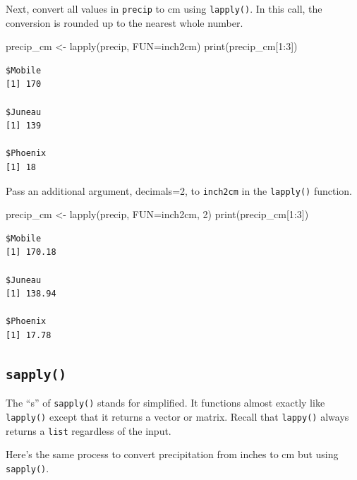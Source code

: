 \documentclass[
  letterpaper,
  DIV=11,
  numbers=noendperiod]{scrreprt}
\newenvironment{Shaded}{\begin{snugshade}}{\end{snugshade}}
\newcommand{\AttributeTok}[1]{\textcolor[rgb]{0.40,0.45,0.13}{#1}}
\newcommand{\DecValTok}[1]{\textcolor[rgb]{0.68,0.00,0.00}{#1}}
\newcommand{\FunctionTok}[1]{\textcolor[rgb]{0.28,0.35,0.67}{#1}}
\newcommand{\NormalTok}[1]{\textcolor[rgb]{0.00,0.23,0.31}{#1}}
\newcommand{\OtherTok}[1]{\textcolor[rgb]{0.00,0.23,0.31}{#1}}
\newcommand{\SpecialCharTok}[1]{\textcolor[rgb]{0.37,0.37,0.37}{#1}}
\begin{document}
Next, convert all values in \texttt{precip} to cm using
\texttt{lapply()}. In this call, the conversion is rounded up to the
nearest whole number.

\begin{Shaded}
\begin{Highlighting}[]
\NormalTok{precip\_cm }\OtherTok{\textless{}{-}} \FunctionTok{lapply}\NormalTok{(precip, }\AttributeTok{FUN=}\NormalTok{inch2cm)}
\FunctionTok{print}\NormalTok{(precip\_cm[}\DecValTok{1}\SpecialCharTok{:}\DecValTok{3}\NormalTok{])}
\end{Highlighting}
\end{Shaded}

\begin{verbatim}
$Mobile
[1] 170

$Juneau
[1] 139

$Phoenix
[1] 18
\end{verbatim}

Pass an additional argument, decimals=2, to \texttt{inch2cm} in the
\texttt{lapply()} function.

\begin{Shaded}
\begin{Highlighting}[]
\NormalTok{precip\_cm }\OtherTok{\textless{}{-}} \FunctionTok{lapply}\NormalTok{(precip, }\AttributeTok{FUN=}\NormalTok{inch2cm, }\DecValTok{2}\NormalTok{)}
\FunctionTok{print}\NormalTok{(precip\_cm[}\DecValTok{1}\SpecialCharTok{:}\DecValTok{3}\NormalTok{])}
\end{Highlighting}
\end{Shaded}

\begin{verbatim}
$Mobile
[1] 170.18

$Juneau
[1] 138.94

$Phoenix
[1] 17.78
\end{verbatim}

\subsection{\texorpdfstring{\texttt{sapply()}}{sapply()}}\label{sapply}

The ``s'' of \texttt{sapply()} stands for simplified. It functions
almost exactly like \texttt{lapply()} except that it returns a vector or
matrix. Recall that \texttt{lappy()} always returns a \texttt{list}
regardless of the input.

Here's the same process to convert precipitation from inches to cm but
using \texttt{sapply()}.
\end{document}

